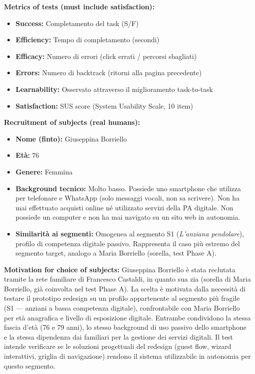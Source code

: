 \documentclass[11pt,a4paper]{article}
\begin{document}
\begin{tcolorbox}[colback=backgroundColor,colframe=borderColor,arc=2mm]
\vspace{0.3cm}
\noindent\textbf{Metrics of tests (must include satisfaction):}
\begin{itemize}
  \item \textbf{Success:} Completamento del task (S/F)
  \item \textbf{Efficiency:} Tempo di completamento (secondi)
  \item \textbf{Efficacy:} Numero di errori (click errati / percorsi sbagliati)
  \item \textbf{Errors:} Numero di backtrack (ritorni alla pagina precedente)
  \item \textbf{Learnability:} Osservato attraverso il miglioramento task-to-task
  \item \textbf{Satisfaction:} SUS score (System Usability Scale, 10 item)
\end{itemize}

\vspace{0.3cm}
\noindent\textbf{Recruitment of subjects (real humans):}
\begin{itemize}
  \item \textbf{Nome (finto):} Giuseppina Borriello
  \item \textbf{Et\`a:} 76
  \item \textbf{Genere:} Femmina
  \item \textbf{Background tecnico:} Molto basso. Possiede uno smartphone che utilizza per telefonare e WhatsApp (solo messaggi vocali, non sa scrivere). Non ha mai effettuato acquisti online n\'e utilizzato servizi della PA digitale. Non possiede un computer e non ha mai navigato su un sito web in autonomia.
  \item \textbf{Similarit\`a ai segmenti:} Omogenea al segmento S1 (\textit{L'anziana pendolare}), profilo di competenza digitale passivo. Rappresenta il caso pi\`u estremo del segmento target, analogo a Maria Borriello (sorella, test Phase A).
\end{itemize}

\vspace{0.3cm}
\noindent\textbf{Motivation for choice of subjects:}
Giuseppina Borriello \`e stata reclutata tramite la rete familiare di Francesco Castaldi, in quanto sua zia (sorella di Maria Borriello, gi\`a coinvolta nel test Phase A). La scelta \`e motivata dalla necessit\`a di testare il prototipo redesign su un profilo appartenente al segmento pi\`u fragile (S1 --- anziani a bassa competenza digitale), confrontabile con Maria Borriello per et\`a anagrafica e livello di esposizione digitale. Entrambe condividono la stessa fascia d'et\`a (76 e 79 anni), lo stesso background di uso passivo dello smartphone e la stessa dipendenza dai familiari per la gestione dei servizi digitali. Il test intende verificare se le soluzioni progettuali del redesign (guest flow, wizard interattivi, griglia di navigazione) rendono il sistema utilizzabile in autonomia per questo segmento.

\end{tcolorbox}
\end{document}
